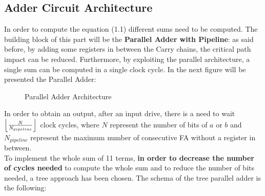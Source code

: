 \subsection{Adder Circuit Architecture}
In order to compute the equation (1.1) different sums need to be computed. The building block of this part will be the \textbf{Parallel Adder with Pipeline}: as said before, by adding some registers in between the Carry chains, the critical path impact can be reduced. Furthermore, by exploiting the parallel architecture, a single sum can be computed in a single clock cycle. In the next figure will be presented the Parallel Adder:
 \begin{figure}[H]
 	\centering
 	\caption{Parallel Adder Architecture}
 \end{figure}
In order to obtain an output, after an input drive, there is a need to wait $\floor*{\frac{N}{N_{pipeline}}}$ clock cycles, where $N$ represent the number of bits of $a$ or $b$ and $N_{pipeline}$ represent the maximum number of consecutive FA without a register in between.\\
To implement the whole sum of 11 terms, \textbf{in order to decrease the number of cycles needed} to compute the whole sum and to reduce the number of bits needed, a tree approach has been chosen. The schema of the tree parallel adder is the following:
